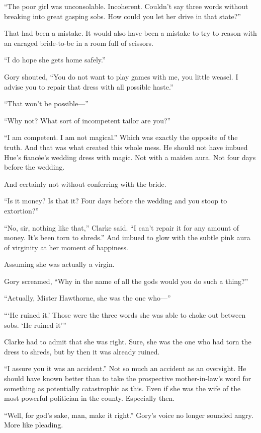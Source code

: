 ``The poor girl was unconsolable. Incoherent. Couldn't say three words
without breaking into great gasping sobs. How could you let her drive in
that state?''

That had been a mistake. It would also have been a mistake to try to
reason with an enraged bride-to-be in a room full of scissors.

``I do hope she gets home safely.''

Gory shouted, ``You do not want to play games with me, you little weasel.
I advise you to repair that dress with all possible haste.''

``That won't be possible---''

``Why not? What sort of incompetent tailor are you?''

``I am competent. I am not magical.'' Which was exactly the opposite of
the truth. And that was what created this whole mess. He should not have
imbued Hue's fiancée's wedding dress with magic. Not with a maiden aura.
Not four days before the wedding.

And certainly not without conferring with the bride.

``Is it money? Is that it? Four days before the wedding and you stoop to
extortion?''

``No, sir, nothing like that,'' Clarke said. ``I can't repair it for any
amount of money. It's been torn to shreds.'' And imbued to glow with the
subtle pink aura of virginity at her moment of happiness.

Assuming she was actually a virgin.

Gory screamed, ``Why in the name of all the gods would you do such a
thing?''

``Actually, Mister Hawthorne, she was the one who---''

``\thinspace `He ruined it.' Those were the three words she was able to choke out
between sobs. `He ruined it'\thinspace ''

Clarke had to admit that she was right. Sure, she was the one who had
torn the dress to shreds, but by then it was already ruined.

``I assure you it was an accident.'' Not so much an accident as an
oversight. He should have known better than to take the prospective
mother-in-law's word for something as potentially catastrophic as this.
Even if she was the wife of the most powerful politician in the county.
Especially then.

``Well, for god's sake, man, make it right.'' Gory's voice no longer
sounded angry. More like pleading.

